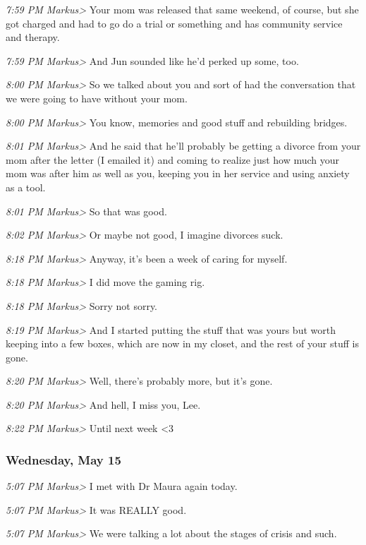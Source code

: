 {\emph{7:59 PM Markus\textgreater{}} Your mom was released that same
weekend, of course, but she got charged and had to go do a trial or
something and has community service and therapy.

\emph{7:59 PM Markus\textgreater{}} And Jun sounded like he'd perked up
some, too.

\emph{8:00 PM Markus\textgreater{}} So we talked about you and sort of
had the conversation that we were going to have without your mom.

\emph{8:00 PM Markus\textgreater{}} You know, memories and good stuff
and rebuilding bridges.

\emph{8:01 PM Markus\textgreater{}} And he said that he'll probably be
getting a divorce from your mom after the letter (I emailed it) and
coming to realize just how much your mom was after him as well as you,
keeping you in her service and using anxiety as a tool.

\emph{8:01 PM Markus\textgreater{}} So that was good.

\emph{8:02 PM Markus\textgreater{}} Or maybe not good, I imagine
divorces suck.

\emph{8:18 PM Markus\textgreater{}} Anyway, it's been a week of caring
for myself.

\emph{8:18 PM Markus\textgreater{}} I did move the gaming rig.

\emph{8:18 PM Markus\textgreater{}} Sorry not sorry.

\emph{8:19 PM Markus\textgreater{}} And I started putting the stuff that
was yours but worth keeping into a few boxes, which are now in my
closet, and the rest of your stuff is gone.

\emph{8:20 PM Markus\textgreater{}} Well, there's probably more, but
it's gone.

\emph{8:20 PM Markus\textgreater{}} And hell, I miss you, Lee.

\emph{8:22 PM Markus\textgreater{}} Until next week \textless{}3

\subsubsection*{Wednesday, May 15}\label{wednesday-may-15}

\emph{5:07 PM Markus\textgreater{}} I met with Dr Maura again today.

\emph{5:07 PM Markus\textgreater{}} It was REALLY good.

\emph{5:07 PM Markus\textgreater{}} We were talking a lot about the
stages of crisis and such.

}
